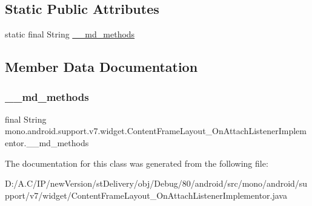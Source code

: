 \subsection*{Static Public Attributes}
\begin{DoxyCompactItemize}
\item 
static final String \hyperlink{classmono_1_1android_1_1support_1_1v7_1_1widget_1_1_content_frame_layout___on_attach_listener_implementor_adb104bec4ab09495309f1f1f22b6fac4}{\+\_\+\+\_\+md\+\_\+methods}
\end{DoxyCompactItemize}


\subsection{Member Data Documentation}
\mbox{\label{classmono_1_1android_1_1support_1_1v7_1_1widget_1_1_content_frame_layout___on_attach_listener_implementor_adb104bec4ab09495309f1f1f22b6fac4}} 
\subsubsection{\texorpdfstring{\+\_\+\+\_\+md\+\_\+methods}{\_\_md\_methods}}
{\footnotesize\ttfamily final String mono.\+android.\+support.\+v7.\+widget.\+Content\+Frame\+Layout\+\_\+\+On\+Attach\+Listener\+Implementor.\+\_\+\+\_\+md\+\_\+methods\hspace{0.3cm}{\ttfamily [static]}}



The documentation for this class was generated from the following file\+:\begin{DoxyCompactItemize}
\item 
D\+:/\+A.\+C/\+I\+P/new\+Version/st\+Delivery/obj/\+Debug/80/android/src/mono/android/support/v7/widget/Content\+Frame\+Layout\+\_\+\+On\+Attach\+Listener\+Implementor.\+java\end{DoxyCompactItemize}
